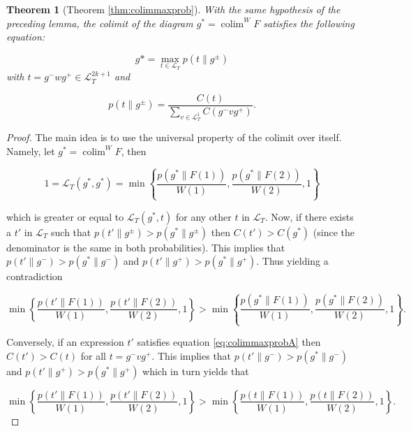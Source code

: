 \documentclass[10pt,a4paper]{elsarticle}
\renewcommand{\L}{\mathcal{L}}
\newcommand{\colim}{\operatorname{colim}}
\newtheorem{theorem}{Theorem}[section]
\begin{document}
{	\begin{theorem}[Theorem \ref{thm:colimmaxprob}]\label{thm:colimmaxprobA}
		With the same hypothesis of the preceding lemma, the colimit of the diagram $g^{*}=\colim ^{W}F$ satisfies the following equation:
		
		\begin{equation}\label{eq:colimmaxprobA}
			g*= \max_{t\in \L_{T}}p(t\| g^{\pm})
		\end{equation}
		with $t=g^{-}wg^{+}\in \L_{T}^{2k+1}$ and
		
		\begin{equation}\label{eq:probW2VA}
			p(t\| g^{\pm})=\frac{C(t)}{\sum_{v\in\L_{T}^{1}}C(g^{-}vg^{+})}.
		\end{equation}
	\end{theorem}
	
	
	\begin{proof}
		The main idea is to use the universal property of the colimit over itself. Namely, let $g^{*}=\colim ^{W}F$, then 
		
		\begin{equation}
			1 = \L_{T}(g^{*},g^{*}) = \min\left\{\frac{p(g^{*}\|F(1))}{W(1)},\frac{p(g^{*}\|F(2))}{W(2)},1 \right\} 
		\end{equation} 
		
		which is greater or equal to $\L_{T}(g^{*},t)$ for any other $t$ in $\L_{T}$. Now, if there exists a $t'$ in $\L_{T}$ such that $p(t'\|g^{\pm})>p(g^{*}\|g^{\pm})$ then $C(t')>C(g^{*})$ (since the denominator is the same in both probabilities). This implies that $p(t'\|g^{-})>p(g^{*}\|g^{-})$ and $p(t'\|g^{+})>p(g^{*}\|g^{+})$. Thus yielding a contradiction
		
		\begin{equation}
			\min\left\{\frac{p(t'\|F(1))}{W(1)},\frac{p(t'\|F(2))}{W(2)},1 \right\} > \min\left\{\frac{p(g^{*}\|F(1))}{W(1)},\frac{p(g^{*}\|F(2))}{W(2)},1 \right\}. 
		\end{equation}
		
		
		Conversely, if an expression $t'$ satisfies equation \eqref{eq:colimmaxprobA} then $C(t')>C(t)$ for all $t=g^{-}vg^{+}$. This implies that $p(t'\|g^{-})>p(g^{*}\|g^{-})$ and $p(t'\|g^{+})>p(g^{*}\|g^{+})$ which in turn yields that 
		
		\begin{equation}
			\min\left\{\frac{p(t'\|F(1))}{W(1)},\frac{p(t'\|F(2))}{W(2)},1 \right\} > \min\left\{\frac{p(t\|F(1))}{W(1)},\frac{p(t\|F(2))}{W(2)},1 \right\}. 
		\end{equation}
		

\end{proof}}
\end{document}

